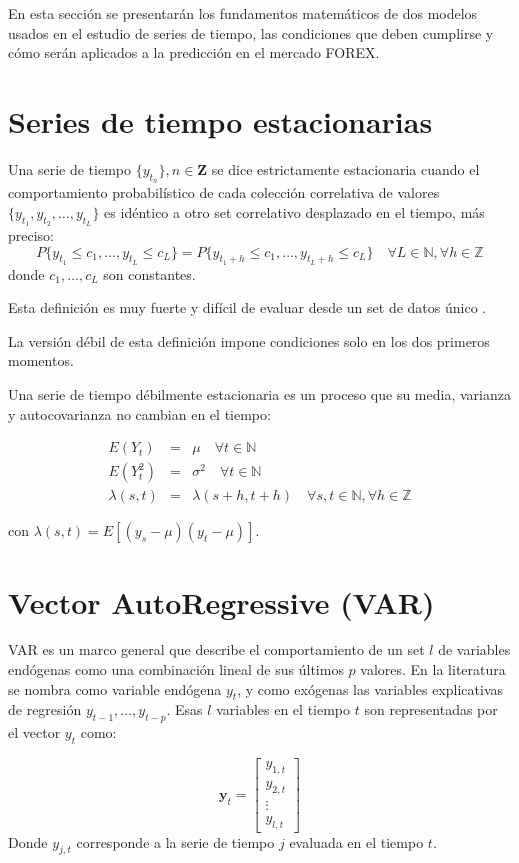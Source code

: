 En esta sección se presentarán los fundamentos matemáticos de dos modelos
usados en el estudio de series de tiempo, las condiciones que deben cumplirse y 
cómo serán aplicados a la predicción en el mercado FOREX. 

\section{Series de tiempo estacionarias}
Una serie de tiempo $\{y_{t_n}\}, n \in \mathbf{Z}$ se dice estrictamente
estacionaria cuando el comportamiento probabilístico de cada colección
correlativa de valores $\{y_{t_1},y_{t_2},\dots,y_{t_L}\}$ es idéntico a otro
set correlativo desplazado en el tiempo, más preciso: 
\[ P\{y_{t_1} \leq
c_1,\dots,y_{t_L} \leq c_L\} = P\{y_{t_1+h} \leq c_1,\dots,y_{t_L+h}
\leq c_L\}
\quad \forall L \in \mathbb{N}, \forall h \in \mathbb{Z}\] \noindent donde
$c_1,\dots,c_L$ son constantes.

Esta definición es muy fuerte y difícil de evaluar desde un set de datos único
\cite{shumway2010time}.

La versión débil de esta definición impone condiciones solo en los dos primeros
momentos.

Una serie de tiempo débilmente estacionaria es un proceso que su media,
varianza y autocovarianza no cambian en el tiempo:

\begin{eqnarray*}
E(Y_t) &=& \mu  \quad \forall t \in \mathbb{N} \\ E(Y^2_t) &=&
\sigma^2  \quad \forall t \in \mathbb{N} \\
\lambda(s,t)&=&\lambda(s+h,t+h) \quad \forall s,t \in \mathbb{N},
\forall h \in \mathbb{Z}
\end{eqnarray*}

\noindent con $\lambda(s,t) = E[(y_s-\mu)(y_t - \mu)]$.

\section{Vector AutoRegressive (VAR)}

VAR es un marco general que describe el comportamiento de un set $l$ de
variables endógenas como una combinación lineal de sus últimos $p$ valores. En
la literatura se nombra como variable endógena $y_t$, y como exógenas las
variables explicativas de regresión $y_{t-1}, \dots, y_{t-p}$.  Esas $l$
variables en el tiempo $t$ son representadas por el vector $y_t$ como:

\begin{equation}
\label{eq:variables}
\mathbf{y}_t = 
\begin{bmatrix} y_{1,t} \\
y_{2,t} \\
\vdots \\
y_{l,t}
\end{bmatrix}
\end{equation}
\noindent Donde $y_{j,t}$ corresponde a la serie de tiempo $j$ evaluada en el
tiempo $t$.

